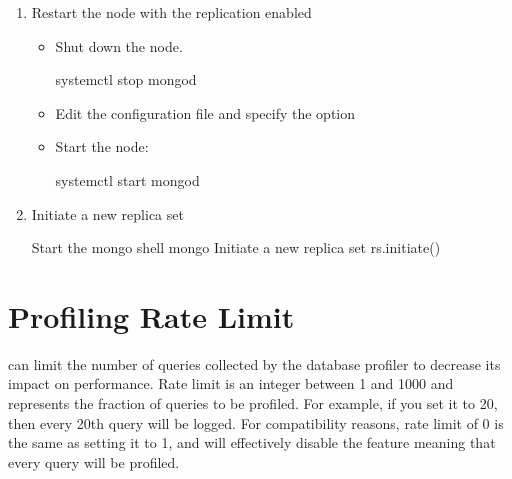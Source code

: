 \documentclass[letterpaper,10pt,english]{sphinxmanual}
\begin{document}
\begin{enumerate}
\item {} 
\sphinxAtStartPar
Restart the node with the replication enabled
\begin{itemize}
\item {} 
\sphinxAtStartPar
Shut down the node.

\begin{sphinxVerbatim}[commandchars=\\\{\}]
\PYGZdl{} systemctl stop mongod
\end{sphinxVerbatim}

\item {} 
\sphinxAtStartPar
Edit the configuration file and specify the  option

\item {} 
\sphinxAtStartPar
Start the  node:

\begin{sphinxVerbatim}[commandchars=\\\{\}]
\PYGZdl{} systemctl start mongod
\end{sphinxVerbatim}

\end{itemize}

\item {} 
\sphinxAtStartPar
Initiate a new replica set

\begin{sphinxVerbatim}[commandchars=\\\{\}]
\PYGZsh{} Start the mongo shell
\PYGZgt{} mongo
\PYGZsh{} Initiate a new replica set
\PYGZgt{} rs.initiate()
\end{sphinxVerbatim}

\end{enumerate}


\chapter{Profiling Rate Limit}
\label{\detokenize{rate-limit:profiling-rate-limit}}\label{\detokenize{rate-limit:rate-limit}}\label{\detokenize{rate-limit::doc}}
\sphinxAtStartPar
{} can limit the number of queries collected by the database profiler
to decrease its impact on performance.
Rate limit is an integer between 1 and 1000
and represents the fraction of queries to be profiled.
For example, if you set it to 20, then every 20th query will be logged.
For compatibility reasons, rate limit of 0 is the same as setting it to 1,
and will effectively disable the feature
meaning that every query will be profiled.
\end{document}
